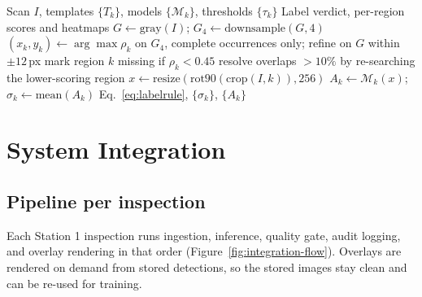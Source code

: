\begin{algorithm}[htbp]
\caption{Label-defect inspection}
\label{alg:label}
\begin{algorithmic}[1]
\Require Scan $I$, templates $\{T_k\}$, models $\{\mathcal{M}_k\}$, thresholds $\{\tau_k\}$
\Ensure Label verdict, per-region scores and heatmaps
\State $G \gets \mathrm{gray}(I)$; $G_4 \gets \mathrm{downsample}(G,4)$
    \State $(x_k,y_k) \gets \arg\max \rho_k$ on $G_4$, complete occurrences only; refine on $G$ within $\pm12$\,px
    \State mark region $k$ missing if $\rho_k<0.45$
\EndFor
\State resolve overlaps $>10\%$ by re-searching the lower-scoring region
    \State $x \gets \mathrm{resize}(\mathrm{rot90}(\mathrm{crop}(I,k)),256)$
    \State $A_k \gets \mathcal{M}_k(x)$;\ $\sigma_k \gets \mathrm{mean}(A_k)$
\EndFor
\State \Return Eq.~\eqref{eq:labelrule}, $\{\sigma_k\}$, $\{A_k\}$
\end{algorithmic}
\end{algorithm}

\section{System Integration}
\label{sec:system-integration}

\subsection{Pipeline per inspection}
Each Station 1 inspection runs ingestion, inference, quality gate, audit logging, and overlay rendering in that order (Figure~\ref{fig:integration-flow}). Overlays are rendered on demand from stored detections, so the stored images stay clean and can be re-used for training.

